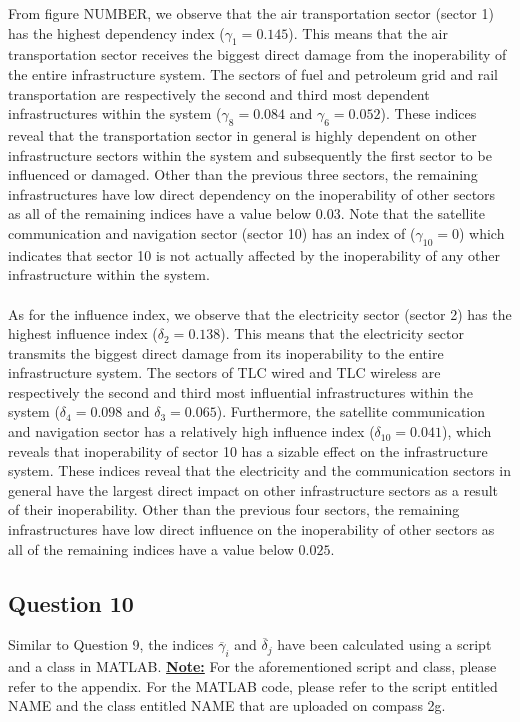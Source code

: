 \documentclass[11pt,a4paper]{article}
\begin{document}
From figure NUMBER, we observe that the air transportation sector (sector 1) has the highest dependency index ($\gamma_1 = 0.145$). This means that the air transportation sector
receives the biggest direct damage from the inoperability of the entire infrastructure system. The sectors of fuel and petroleum grid and rail transportation are respectively the second and third most dependent infrastructures within the system ($\gamma_8 = 0.084$  and  $\gamma_6 = 0.052$). These indices reveal that the transportation sector in general is highly dependent on other infrastructure sectors within the system and subsequently the first sector to be influenced or damaged. Other than the previous three sectors, the remaining infrastructures have low direct dependency on the inoperability of other sectors as all of the remaining indices have a value below $0.03$. Note that the satellite communication and navigation sector (sector 10) has an index of ($\gamma_10 = 0$) which indicates that sector 10 is not actually affected by the inoperability of any other infrastructure within the system.\\
\\
As for the influence index, we observe that the electricity sector (sector 2) has the highest influence index ($\delta_2 = 0.138$). This means that the electricity sector
transmits the biggest direct damage from its inoperability to the entire infrastructure system. The sectors of TLC wired and TLC wireless are respectively the second and third most influential infrastructures within the system ($\delta_4 = 0.098$  and  $\delta_3 = 0.065$). Furthermore, the satellite communication and navigation sector has a relatively high influence index ($\delta_10 = 0.041$), which reveals that inoperability of sector 10 has a sizable effect on the infrastructure system. These indices reveal that the electricity and the communication sectors in general have the largest direct impact on other infrastructure sectors as a result of their inoperability. Other than the previous four sectors, the remaining infrastructures have low direct influence on the inoperability of other sectors as all of the remaining indices have a value below $0.025$.

\subsection*{Question 10}
Similar to Question 9, the indices $\overline\gamma_i$ and $\overline\delta_j$ have been calculated using a script and a class in MATLAB.
\underline{\textbf{Note:}} For the aforementioned script and class, please refer to the appendix. For the MATLAB code, please refer to the script entitled NAME and the class entitled NAME that are uploaded on compass 2g.
\end{document}
